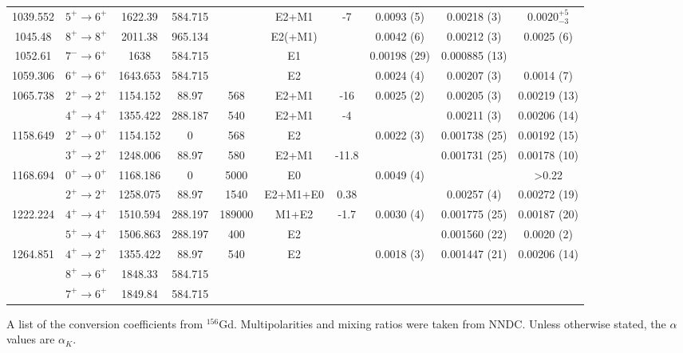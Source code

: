 \begin{landscape}
\begin{longtable}{c|c|c|c|c|c|c|c|c|c}
1039.552	&	$5^+	\rightarrow	6^+$	&	1622.39	&	584.715	&		&	E2+M1	&	-7	&	0.0093 (5)	&	0.00218 (3)	&	$0.0020^{+5}_{-3}$	\\
1045.48	&	$8^+	\rightarrow	8^+$	&	2011.38	&	965.134	&		&	E2(+M1)	&		&	0.0042 (6)	&	0.00212 (3)	&	0.0025 (6)	\\
1052.61	&	$7^-	\rightarrow	6^+$	&	1638	&	584.715	&		&	E1	&		&	0.00198 (29)	&	0.000885 (13)	&		\\
1059.306	&	$6^+	\rightarrow	6^+$	&	1643.653	&	584.715	&		&	E2	&		&	0.0024 (4)	&	0.00207 (3)	&	0.0014 (7)	\\
1065.738	&	$2^+	\rightarrow	2^+$	&	1154.152	&	88.97	&	568	&	E2+M1	&	-16	&	0.0025 (2)	&	0.00205 (3)	&	0.00219 (13)	\\
	&	$4^+	\rightarrow	4^+$	&	1355.422	&	288.187	&	540	&	E2+M1	&	-4	&		&	0.00211 (3)	&	0.00206 (14)	\\
1158.649	&	$2^+	\rightarrow	0^+$	&	1154.152	&	0	&	568	&	E2	&		&	0.0022 (3)	&	0.001738 (25)	&	0.00192 (15)	\\
	&	$3^+	\rightarrow	2^+$	&	1248.006	&	88.97	&	580	&	E2+M1	&	-11.8	&		&	0.001731 (25)	&	0.00178 (10)	\\
1168.694	&	$0^+	\rightarrow	0^+$	&	1168.186	&	0	&	5000	&	E0	&		&	0.0049 (4)	&		&	>0.22	\\
	&	$2^+	\rightarrow	2^+$	&	1258.075	&	88.97	&	1540	&	E2+M1+E0	&	0.38	&		&	0.00257 (4)	&	0.00272 (19)	\\
1222.224	&	$4^+	\rightarrow	4^+$	&	1510.594	&	288.197	&	189000	&	M1+E2	&	-1.7	&	0.0030 (4)	&	0.001775 (25)	&	0.00187 (20)	\\
	&	$5^+	\rightarrow	4^+$	&	1506.863	&	288.197	&	400	&	E2	&		&		&	0.001560 (22)	&	0.0020 (2)	\\
1264.851	&	$4^+	\rightarrow	2^+$	&	1355.422	&	88.97	&	540	&	E2	&		&	0.0018 (3)	&	0.001447 (21)	&	0.00206 (14)	\\
	&	$8^+	\rightarrow	6^+$	&	1848.33	&	584.715	&		&		&		&		&		&		\\
	&	$7^+	\rightarrow	6^+$	&	1849.84	&	584.715	&		&		&		&		&		&		\\ \bottomrule
    \end{longtable}
    \caption{A list of the conversion coefficients from $^{156}$Gd. Multipolarities and mixing ratios were taken from NNDC. Unless otherwise stated, the $\alpha$ values are $\alpha_K$.}
\end{landscape}

